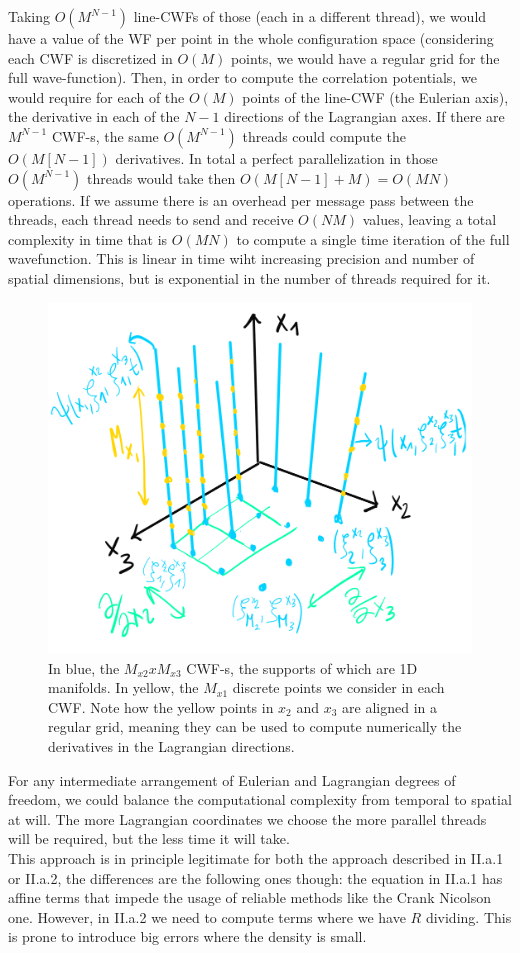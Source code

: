 \documentclass[11pt, a4paper]{article} %
\DeclareRobustCommand{\mybox}[2][gray!10]{%
\begin{tcolorbox}[   %
        left=0.2cm,
        right=0.2cm,
        top=0.15cm,
        bottom=0.15cm,
        colback=#1,
        colframe=#1,
        width=\dimexpr\textwidth\relax, 
        enlarge left by=0mm,
        boxsep=5pt,
        arc=0pt,outer arc=0pt,
        ]
        #2
\end{tcolorbox}
}
\begin{document}
\mybox{ Taking $O(M^{N-1})$ line-CWFs of those (each in a different thread), we would have a value of the WF per point in the whole configuration space (considering each CWF is discretized in $O(M)$ points, we would have a regular grid for the full wave-function). Then, in order to compute the correlation potentials, we would require for each of the $O(M)$ points of the line-CWF (the Eulerian axis), the derivative in each of the $N-1$ directions of the Lagrangian axes. If there are $M^{N-1}$ CWF-s, the same $O(M^{N-1})$ threads could compute the $O(M[N-1])$ derivatives. In total a perfect parallelization in those $O(M^{N-1})$ threads would take then $O(M[N-1]+M)=O(MN)$ operations. If we assume there is an overhead per message pass between the threads, each thread needs to send and receive $O(NM)$ values, leaving a total complexity in time that is $O(MN)$ to compute a single time iteration of the full wavefunction. This is linear in time wiht increasing precision and number of spatial dimensions, but is exponential in the number of threads required for it.}

\begin{figure}[h!]
  \centering
    \includegraphics[width=0.5\linewidth]{rectas.png}
  \caption{In blue, the $M_{x2}xM_{x3}$ CWF-s, the supports of which are 1D manifolds. In yellow, the $M_{x1}$ discrete points we consider in each CWF. Note how the yellow points in $x_2$ and $x_3$ are aligned in a regular grid, meaning they can be used to compute numerically the derivatives in the Lagrangian directions.  }
  \label{fig:lines}
\end{figure}

\mybox{
For any intermediate arrangement of Eulerian and Lagrangian degrees of freedom, we could balance the computational complexity from temporal to spatial at will. The more Lagrangian coordinates we choose the more parallel threads will be required, but the less time it will take.\\

This approach is in principle legitimate for both the approach described in II.a.1 or II.a.2, the differences are the following ones though: the equation in II.a.1 has affine terms that impede the usage of reliable methods like the Crank Nicolson one. However, in II.a.2 we need to compute terms where we have $R$ dividing. This is prone to introduce big errors where the density is small.

}
\end{document}

